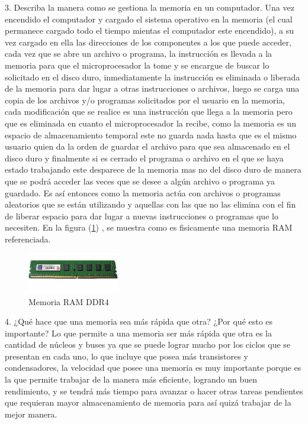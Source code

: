 \documentclass{article}
\begin{document}
3. Describa la manera como se gestiona la memoria en un computador.
Una vez encendido el computador y cargado el sistema operativo en la memoria (el cual permanece cargado todo el tiempo mientas el computador este encendido),  a su vez cargado en ella las direcciones de los componentes a los que puede acceder, cada vez que se abre un archivo o programa, la instrucción es llevada a la memoria para que el microprocesador la tome y se encargue de buscar lo solicitado en el disco duro, inmediatamente la instrucción es eliminada o liberada de la memoria para dar lugar a otras instrucciones o archivos, luego se carga una copia de los archivos y/o programas solicitados por el usuario en la memoria, cada modificación que se realice es una instrucción que llega a la memoria pero que es eliminada en cuanto el microprocesador la recibe, como la memoria es un espacio de almacenamiento temporal este no guarda nada hasta que es el mismo usuario quien da la orden de guardar el archivo para que sea almacenado en el disco duro y finalmente si es cerrado el programa o archivo en el que se haya estado trabajando este desparece de la memoria mas no del disco duro de manera que se podrá acceder las veces que se desee a algún archivo o programa ya guardado. Es así entonces como la memoria actúa con archivos o programas aleatorios que se están utilizando y aquellas con las que no las elimina con el fin de liberar espacio para dar lugar a nuevas instrucciones o programas que lo necesiten.
En la figura (\ref{fig:RAM.jpg}) , se muestra como es fisicamente una memoria RAM referenciada.

\begin{figure}[h]
\includegraphics[width=4cm]{RAM.jpg}
\centering
\caption{Memoria RAM DDR4}
\label{fig:RAM.jpg}
\end{figure}


4. ¿Qué hace que una memoria sea más rápida que otra? ¿Por qué esto es importante?
Lo que permite a una memoria ser más rápida que otra es la cantidad de núcleos y buses ya que se puede lograr mucho por los ciclos que se presentan en cada uno, lo que incluye que posea más transistores y condensadores, la velocidad que posee una memoria es muy importante porque es la que permite trabajar de la manera más eficiente, logrando un buen rendimiento, y se tendrá más tiempo para avanzar o hacer otras tareas pendientes que requieran mayor almacenamiento de memoria para así quizá trabajar de la mejor manera.
\end{document}
